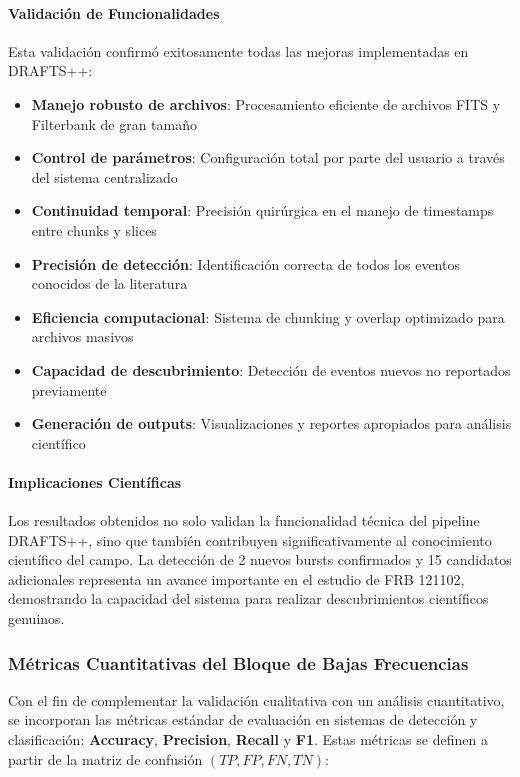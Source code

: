 \paragraph{Validación de Funcionalidades}

Esta validación confirmó exitosamente todas las mejoras implementadas en DRAFTS++:

\begin{itemize}
    \item \textbf{Manejo robusto de archivos}: Procesamiento eficiente de archivos FITS y Filterbank de gran tamaño
    \item \textbf{Control de parámetros}: Configuración total por parte del usuario a través del sistema centralizado
    \item \textbf{Continuidad temporal}: Precisión quirúrgica en el manejo de timestamps entre chunks y slices
    \item \textbf{Precisión de detección}: Identificación correcta de todos los eventos conocidos de la literatura
    \item \textbf{Eficiencia computacional}: Sistema de chunking y overlap optimizado para archivos masivos
    \item \textbf{Capacidad de descubrimiento}: Detección de eventos nuevos no reportados previamente
    \item \textbf{Generación de outputs}: Visualizaciones y reportes apropiados para análisis científico
\end{itemize}

\paragraph{Implicaciones Científicas}

Los resultados obtenidos no solo validan la funcionalidad técnica del pipeline DRAFTS++, sino que también contribuyen significativamente al conocimiento científico del campo. La detección de 2 nuevos bursts confirmados y 15 candidatos adicionales representa un avance importante en el estudio de FRB 121102, demostrando la capacidad del sistema para realizar descubrimientos científicos genuinos.

\subsubsection{Métricas Cuantitativas del Bloque de Bajas Frecuencias}

Con el fin de complementar la validación cualitativa con un análisis cuantitativo, se incorporan las métricas estándar de evaluación en sistemas de detección y clasificación: \textbf{Accuracy}, \textbf{Precision}, \textbf{Recall} y \textbf{F1}. Estas métricas se definen a partir de la matriz de confusión \((TP, FP, FN, TN)\):

